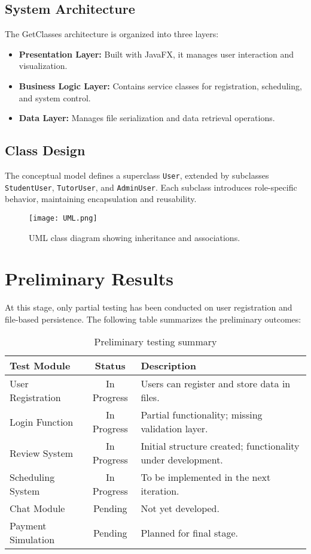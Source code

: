 \documentclass[12pt,a4paper]{report}
\begin{document}
\section{System Architecture}
The GetClasses architecture is organized into three layers:
\begin{itemize}
    \item \textbf{Presentation Layer:} Built with JavaFX, it manages user interaction and visualization.
    \item \textbf{Business Logic Layer:} Contains service classes for registration, scheduling, and system control.
    \item \textbf{Data Layer:} Manages file serialization and data retrieval operations.
\end{itemize}


\newpage


\section{Class Design}
The conceptual model defines a superclass \texttt{User}, extended by subclasses \texttt{StudentUser}, \texttt{TutorUser}, and \texttt{AdminUser}. Each subclass introduces role-specific behavior, maintaining encapsulation and reusability.

\begin{figure}[H]
    \centering
    \texttt{[image: UML.png]}
    \caption{UML class diagram showing inheritance and associations.}
    \label{fig:uml}
\end{figure}


\chapter{Preliminary Results}
At this stage, only partial testing has been conducted on user registration and file-based persistence. The following table summarizes the preliminary outcomes:


\begin{table}[H]
\centering
\caption{Preliminary testing summary}
\begin{tabular}{|l|c|l|}
\hline
\textbf{Test Module} & \textbf{Status} & \textbf{Description} \\
\hline
User Registration & In Progress & Users can register and store data in files. \\
\hline
Login Function & In Progress & Partial functionality; missing validation layer. \\
\hline
Review System & In Progress & Initial structure created; functionality under development. \\
\hline
Scheduling System & In Progress & To be implemented in the next iteration. \\
\hline
Chat Module & Pending & Not yet developed. \\
\hline
Payment Simulation & Pending & Planned for final stage. \\
\hline

\end{tabular}
\label{tab:results}
\end{table}
\end{document}
